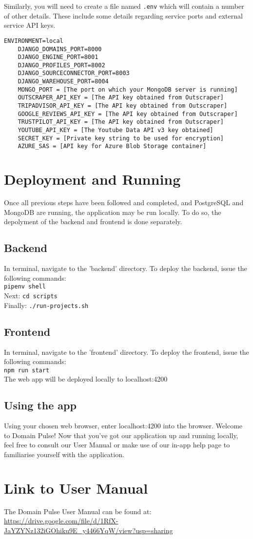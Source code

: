 \documentclass[12pt]{article}
\begin{document}
Similarly, you will need to create a file named \texttt{.env} which will contain a number of other details. These include some details
regarding service ports and external service API keys.
\begin{lstlisting}[basicstyle=\ttfamily]
    ENVIRONMENT=local
    DJANGO_DOMAINS_PORT=8000
    DJANGO_ENGINE_PORT=8001
    DJANGO_PROFILES_PORT=8002
    DJANGO_SOURCECONNECTOR_PORT=8003
    DJANGO_WAREHOUSE_PORT=8004
    MONGO_PORT = [The port on which your MongoDB server is running]
    OUTSCRAPER_API_KEY = [The API key obtained from Outscraper]
    TRIPADVISOR_API_KEY = [The API key obtained from Outscraper]
    GOOGLE_REVIEWS_API_KEY = [The API key obtained from Outscraper]
    TRUSTPILOT_API_KEY = [The API key obtained from Outscraper]
    YOUTUBE_API_KEY = [The Youtube Data API v3 key obtained]
    SECRET_KEY = [Private key string to be used for encryption]
    AZURE_SAS = [API key for Azure Blob Storage container]
\end{lstlisting}



\section{Deployment and Running}
Once all previous steps have been followed and completed, and PostgreSQL and MongoDB are running, the application may be run locally. To do so,
the depolyment of the backend and frontend is done separately.
\subsection{Backend}
In terminal, navigate to the 'backend' directory. To deploy the backend, issue the following commands:\\ \texttt{pipenv shell}
\\Next: \texttt{cd scripts}\\
Finally: \texttt{./run-projects.sh}\\

\subsection{Frontend}
In terminal, navigate to the 'frontend' directory. To deploy the frontend, issue the following commands:\\
\texttt{npm run start}\\
The web app will be deployed locally to localhost:4200

\subsection{Using the app}
Using your chosen web browser, enter localhost:4200 into the browser. Welcome to Domain Pulse! Now that you've got our application
up and running locally, feel free to consult our User Manual or make use of our in-app help page to familiarise yourself with the application.

\section{Link to User Manual}
The Domain Pulse User Manual can be found at: \url{https://drive.google.com/file/d/1RfX-JaYZYNz132iGOhiku9E_y4466YqW/view?usp=sharing}
\end{document}
